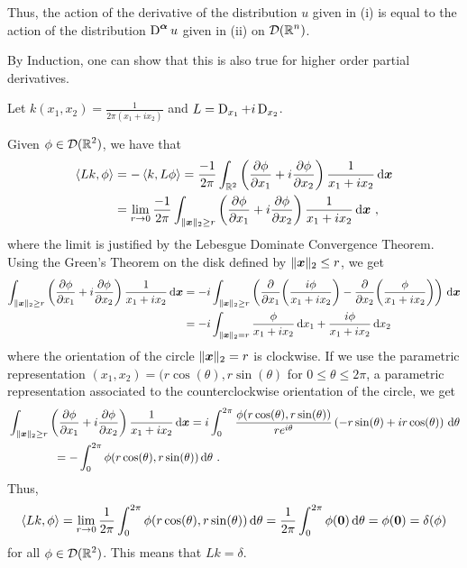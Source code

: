 \begin{egg}
Thus, the action of the derivative of the distribution $u$ given in
(i) is equal to the action of the distribution
$\displaystyle \diff^{\VEC{\alpha}} u$
given in (ii) on $\displaystyle \DD(\RR^n)$.

By Induction, one can show that this is also true for higher order
partial derivatives.
\end{egg}

\begin{egg}
Let $\displaystyle k(x_1,x_2) = \frac{1}{2\pi(x_1 + i x_2)}$ and
$L = \diff_{x_1} + i \diff_{x_2}$.

Given $\displaystyle \phi \in \DD(\RR^2)$, we have that
\begin{align*}
\ps{L k}{\phi} &= - \ps{k}{L\phi}
= \frac{-1}{2\pi} \int_{\RR^2} \left( \pdydx{\phi}{x_1} + i
\pdydx{\phi}{x_2} \right) \frac{1}{x_1 + i x_2} \dx{\VEC{x}} \\
&= \lim_{r\to 0} \frac{-1}{2\pi} \int_{\|\VEC{x}\|_2\geq r}
\left( \pdydx{\phi}{x_1} + i \pdydx{\phi}{x_2} \right)
\frac{1}{x_1 + i x_2} \dx{\VEC{x}}  \ ,
\end{align*}
where the limit is justified by the Lebesgue Dominate Convergence
Theorem.  Using the Green's Theorem on the disk defined by
$\displaystyle \|\VEC{x}\|_2 \leq r$, we get
\begin{align*}
\int_{\|\VEC{x}\|_2\geq r}
\left( \pdydx{\phi}{x_1} + i \pdydx{\phi}{x_2} \right) \frac{1}{x_1 + i x_2}
\dx{\VEC{x}}
&= -i \int_{\|\VEC{x}\|_2\geq r}
\left( \pdfdx{\left(\frac{i \phi}{x_1 + i x_2}\right)}{x_1}
- \pdfdx{\left(\frac{\phi}{x_1 + i x_2}\right)}{x_2}  \right) \dx{\VEC{x}} \\
&= -i \int_{\|\VEC{x}\|_2 = r}
\frac{\phi}{x_1 + i x_2} \dx{x_1} + \frac{i\phi}{x_1 + i x_2} \dx{x_2}
\end{align*}
where the orientation of the circle $\|\VEC{x}\|_2 = r$
is clockwise.  If we use the parametric representation
$(x_1,x_2) = (r\cos(\theta),r\sin(\theta)$ for
$0 \leq \theta \leq 2\pi$, a parametric representation associated to
the counterclockwise orientation of the circle, we get
\begin{align*}
&\int_{\|\VEC{x}\|_2\geq r}
\left( \pdydx{\phi}{x_1} + i \pdydx{\phi}{x_2} \right)
\frac{1}{x_1 + i x_2} \dx{\VEC{x}} 
= i \int_0^{2\pi} \frac{\phi(r\cos(\theta),r\sin(\theta))}{r e^{i \theta}}
\left( -r \sin(\theta) + i r \cos(\theta) \right) \dx{\theta} \\
&\qquad \qquad
= - \int_0^{2\pi} \phi(r\cos(\theta),r\sin(\theta)) \dx{\theta} \ .
\end{align*}
Thus,
\[
\ps{L k}{\phi} = \lim_{r\to 0} \frac{1}{2\pi}
\int_0^{2\pi} \phi(r\cos(\theta),r\sin(\theta)) \dx{\theta}
= \frac{1}{2\pi} \int_0^{2\pi} \phi(\VEC{0}) \dx{\theta}
= \phi(\VEC{0}) = \delta(\phi)
\]
for all $\displaystyle \phi \in \DD(\RR^2)$.  This means that
$L k = \delta$.
\end{egg}

